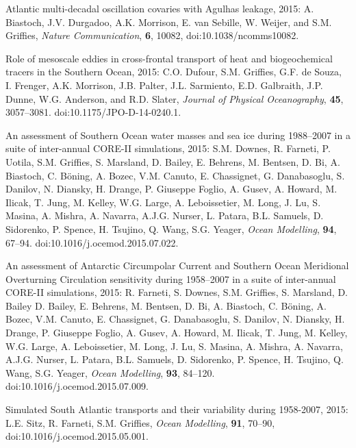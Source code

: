 \begin{etaremune}
\item Atlantic multi-decadal oscillation covaries with Agulhas leakage, 2015: A. Biastoch, J.V. Durgadoo, A.K. Morrison, E. van Sebille, W. Weijer, and S.M. Grif\/f\/ies, {\it Nature Communication}, {\bf 6}, 10082, doi:10.1038/ncomms10082.

\item Role of mesoscale eddies in cross-frontal transport of heat and biogeochemical tracers in the Southern Ocean, 2015: C.O. Dufour, S.M. Grif\/f\/ies, G.F. de Souza, I. Frenger, A.K. Morrison, J.B. Palter, J.L. Sarmiento, E.D. Galbraith, J.P. Dunne, W.G. Anderson, and R.D. Slater, {\it Journal of Physical Oceanography}, {\bf 45}, 3057--3081. 
doi:10.1175/JPO-D-14-0240.1.

\item An assessment of Southern Ocean water masses and sea ice during
  1988--2007 in a suite of inter-annual CORE-II simulations, 2015:
  S.M. Downes, R. Farneti, P. Uotila, S.M. Grif\/f\/ies,
  S. Marsland, D. Bailey, E. Behrens, M. Bentsen, D. Bi, A. Biastoch,
  C. B\"oning, A. Bozec, V.M. Canuto, E. Chassignet, G. Danabasoglu,
  S. Danilov, N. Diansky, H. Drange, P. Giuseppe Foglio, A. Gusev,
  A. Howard, M. Ilicak, T.  Jung, M. Kelley, W.G. Large,
  A. Leboissetier, M. Long, J. Lu, S. Masina, A. Mishra, A. Navarra,
  A.J.G. Nurser, L. Patara, B.L. Samuels, D. Sidorenko, P. Spence,
  H. Tsujino, Q. Wang, S.G. Yeager, {\it Ocean Modelling}, {\bf 94},
  67--94.  doi:10.1016/j.ocemod.2015.07.022.



\item An assessment of Antarctic Circumpolar Current and Southern
  Ocean Meridional Overturning Circulation sensitivity during
  1958--2007 in a suite of inter-annual CORE-II simulations, 2015:
  R. Farneti, S. Downes, S.M. Grif\/f\/ies, S. Marsland,
  D. Bailey D. Bailey, E. Behrens, M. Bentsen, D. Bi, A. Biastoch,
  C. B\"oning, A. Bozec, V.M. Canuto, E. Chassignet, G. Danabasoglu,
  S. Danilov, N. Diansky, H. Drange, P. Giuseppe Foglio, A. Gusev,
  A. Howard, M. Ilicak, T.  Jung, M. Kelley, W.G. Large,
  A. Leboissetier, M. Long, J. Lu, S. Masina, A. Mishra, A. Navarra,
  A.J.G. Nurser, L. Patara, B.L. Samuels, D. Sidorenko, P. Spence,
  H. Tsujino, Q. Wang, S.G. Yeager, {\it Ocean Modelling}, {\bf 93},
  84--120. doi:10.1016/j.ocemod.2015.07.009.

\item Simulated South Atlantic transports and their variability during
  1958-2007, 2015: L.E.  Sitz, R. Farneti, S.M. Grif\/f\/ies,
  {\it Ocean Modelling}, {\bf 91}, 70--90,
  doi:10.1016/j.ocemod.2015.05.001.


\end{etaremune}
